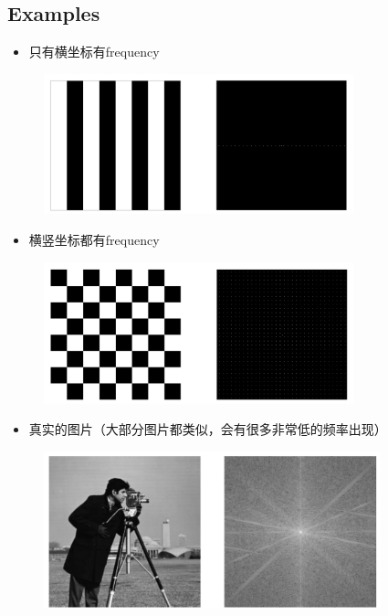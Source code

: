 \documentclass[11pt]{article}
\begin{document}
\subsection*{Examples}
\begin{itemize}
  \item 只有横坐标有frequency
\end{itemize}
\begin{figure}[bht!]
  \centering
  \includegraphics[width=0.8\textwidth]{images/e1.png}
\end{figure}
\begin{itemize}
  \item 横竖坐标都有frequency
\end{itemize}
\begin{figure}[bht!]
  \centering
  \includegraphics[width=0.8\textwidth]{images/e2.png}
\end{figure}
\begin{itemize}
  \item 真实的图片（大部分图片都类似，会有很多非常低的频率出现）
\end{itemize}
\begin{figure}[bht!]
  \centering
  \includegraphics[width=0.87\textwidth]{images/e3.png}
\end{figure}
\end{document}
